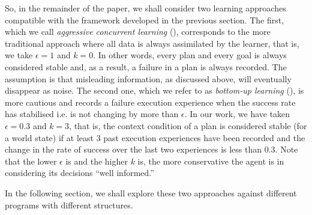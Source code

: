 So, in the remainder of the paper, we shall consider two learning approaches
compatible with the framework developed in the previous section. The first, which
we call \emph{aggressive concurrent learning} (\CL), corresponds to the more
traditional approach where all data is always assimilated by the learner, that
is, we take $\epsilon = 1$ and $k = 0$. In other words, every plan and every goal
is always considered stable and, as a result, a failure in a plan is always
recorded. The assumption is that misleading information, as discussed above, will
eventually disappear as noise.
The second one, which we refer to as \emph{bottom-up learning} (\BUL), is more
cautious and records a failure execution experience when the success rate has stabilised i.e. is not changing by more than $\epsilon$.
In our work, we have taken
$\epsilon = 0.3$ and $k = 3$, that is, the context condition of a plan is
considered stable (for a world state) if at least $3$ past execution experiences
have been recorded 
and the change in the rate of success over the last two experiences is less than $0.3$.
Note that the lower $\epsilon$ is and the higher $k$ is, the more conservative
the agent is in considering its decisions ``well informed.''

In the following section, we shall explore these two approaches against
different programs with different structures.




